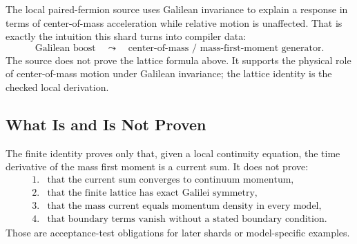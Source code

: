 The local paired-fermion source uses Galilean invariance to explain a response
in terms of center-of-mass acceleration while relative motion is unaffected.
That is exactly the intuition this shard turns into compiler data:
\[
  \text{Galilean boost} \quad\leadsto\quad
  \text{center-of-mass / mass-first-moment generator}.
\]
The source does not prove the lattice formula above.  It supports the physical
role of center-of-mass motion under Galilean invariance; the lattice identity is
the checked local derivation.

\subsection{What Is and Is Not Proven}

The finite identity proves only that, given a local continuity equation, the
time derivative of the mass first moment is a current sum.  It does not prove:
\[
\begin{array}{ll}
1.&\text{that the current sum converges to continuum momentum},\\
2.&\text{that the finite lattice has exact Galilei symmetry},\\
3.&\text{that the mass current equals momentum density in every model},\\
4.&\text{that boundary terms vanish without a stated boundary condition}.
\end{array}
\]
Those are acceptance-test obligations for later shards or model-specific
examples.
